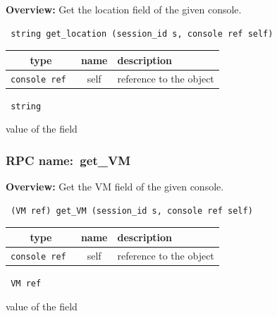 {\bf Overview:} 
Get the location field of the given console.

\begin{verbatim} string get_location (session_id s, console ref self)\end{verbatim}



 
\vspace{0.3cm}
\begin{tabular}{|c|c|p{7cm}|}
 \hline
{\bf type} & {\bf name} & {\bf description} \\ \hline
{\tt console ref } & self & reference to the object \\ \hline 

\end{tabular}

\vspace{0.3cm}

{\tt 
string
}


value of the field
\vspace{0.3cm}
\vspace{0.3cm}
\vspace{0.3cm}
\subsubsection{RPC name:~get\_VM}

{\bf Overview:} 
Get the VM field of the given console.

\begin{verbatim} (VM ref) get_VM (session_id s, console ref self)\end{verbatim}



 
\vspace{0.3cm}
\begin{tabular}{|c|c|p{7cm}|}
 \hline
{\bf type} & {\bf name} & {\bf description} \\ \hline
{\tt console ref } & self & reference to the object \\ \hline 

\end{tabular}

\vspace{0.3cm}

{\tt 
VM ref
}


value of the field
\vspace{0.3cm}
\vspace{0.3cm}
\vspace{0.3cm}
